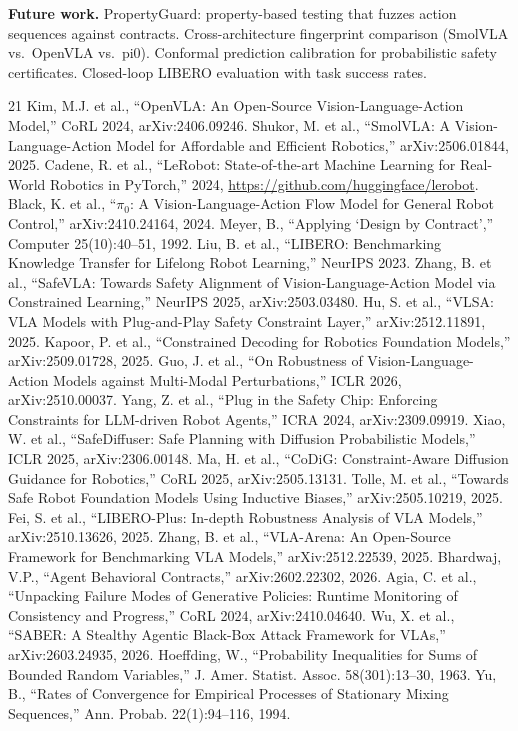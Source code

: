 \documentclass[conference]{IEEEtran}
\begin{document}
\textbf{Future work.}
PropertyGuard: property-based testing that fuzzes action sequences against contracts.
Cross-architecture fingerprint comparison (SmolVLA vs.\ OpenVLA vs.\ pi0).
Conformal prediction calibration for probabilistic safety certificates.
Closed-loop LIBERO evaluation with task success rates.

\begin{thebibliography}{21}
 Kim, M.J. et al., ``OpenVLA: An Open-Source Vision-Language-Action Model,'' CoRL 2024, arXiv:2406.09246.
 Shukor, M. et al., ``SmolVLA: A Vision-Language-Action Model for Affordable and Efficient Robotics,'' arXiv:2506.01844, 2025.
 Cadene, R. et al., ``LeRobot: State-of-the-art Machine Learning for Real-World Robotics in PyTorch,'' 2024, \url{https://github.com/huggingface/lerobot}.
 Black, K. et al., ``$\pi_0$: A Vision-Language-Action Flow Model for General Robot Control,'' arXiv:2410.24164, 2024.
 Meyer, B., ``Applying `Design by Contract','' Computer 25(10):40--51, 1992.
 Liu, B. et al., ``LIBERO: Benchmarking Knowledge Transfer for Lifelong Robot Learning,'' NeurIPS 2023.
 Zhang, B. et al., ``SafeVLA: Towards Safety Alignment of Vision-Language-Action Model via Constrained Learning,'' NeurIPS 2025, arXiv:2503.03480.
 Hu, S. et al., ``VLSA: VLA Models with Plug-and-Play Safety Constraint Layer,'' arXiv:2512.11891, 2025.
 Kapoor, P. et al., ``Constrained Decoding for Robotics Foundation Models,'' arXiv:2509.01728, 2025.
 Guo, J. et al., ``On Robustness of Vision-Language-Action Models against Multi-Modal Perturbations,'' ICLR 2026, arXiv:2510.00037.
 Yang, Z. et al., ``Plug in the Safety Chip: Enforcing Constraints for LLM-driven Robot Agents,'' ICRA 2024, arXiv:2309.09919.
 Xiao, W. et al., ``SafeDiffuser: Safe Planning with Diffusion Probabilistic Models,'' ICLR 2025, arXiv:2306.00148.
 Ma, H. et al., ``CoDiG: Constraint-Aware Diffusion Guidance for Robotics,'' CoRL 2025, arXiv:2505.13131.
 Tolle, M. et al., ``Towards Safe Robot Foundation Models Using Inductive Biases,'' arXiv:2505.10219, 2025.
 Fei, S. et al., ``LIBERO-Plus: In-depth Robustness Analysis of VLA Models,'' arXiv:2510.13626, 2025.
 Zhang, B. et al., ``VLA-Arena: An Open-Source Framework for Benchmarking VLA Models,'' arXiv:2512.22539, 2025.
 Bhardwaj, V.P., ``Agent Behavioral Contracts,'' arXiv:2602.22302, 2026.
 Agia, C. et al., ``Unpacking Failure Modes of Generative Policies: Runtime Monitoring of Consistency and Progress,'' CoRL 2024, arXiv:2410.04640.
 Wu, X. et al., ``SABER: A Stealthy Agentic Black-Box Attack Framework for VLAs,'' arXiv:2603.24935, 2026.
 Hoeffding, W., ``Probability Inequalities for Sums of Bounded Random Variables,'' J. Amer. Statist. Assoc. 58(301):13--30, 1963.
 Yu, B., ``Rates of Convergence for Empirical Processes of Stationary Mixing Sequences,'' Ann. Probab. 22(1):94--116, 1994.
\end{thebibliography}
\end{document}
